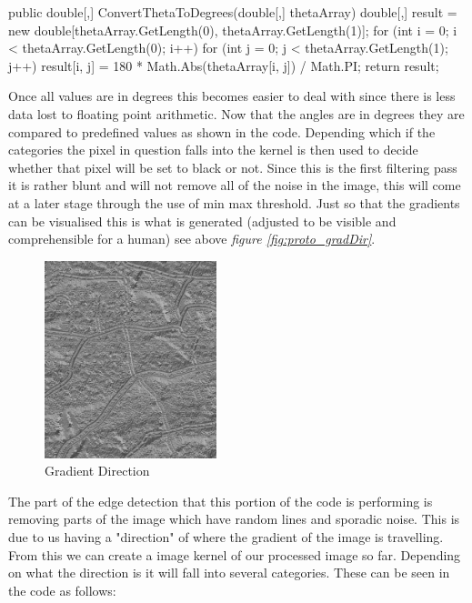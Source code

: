 \begin{FlushLeft}
        \begin{cscode}
public double[,] ConvertThetaToDegrees(double[,] thetaArray)
{
    double[,] result = new double[thetaArray.GetLength(0), thetaArray.GetLength(1)];
    for (int i = 0; i < thetaArray.GetLength(0); i++) for (int j = 0; j < thetaArray.GetLength(1); j++) result[i, j] = 180 * Math.Abs(thetaArray[i, j]) / Math.PI;
    return result;
}
        \end{cscode}
        
        Once all values are in degrees this becomes easier to deal with since there is less data lost to floating point arithmetic. Now that the angles are in degrees they are compared to predefined values as shown in the code. Depending which if the categories the pixel in question falls into the kernel is then used to decide whether that pixel will be set to black or not. Since this is the first filtering pass it is rather blunt and will not remove all of the noise in the image, this will come at a later stage through the use of min max threshold. Just so that the gradients can be visualised this is what is generated (adjusted to be visible and comprehensible for a human) see above \textit{figure \ref{fig:proto_gradDir}}. \\ \bk

        \begin{figure}[H]
            \centering
            \includegraphics[width=5cm]{images/edgeDetectionPrototype/f.jpg}
            \caption{Gradient Direction}
            \label{fig:proto_gradDirection}
        \end{figure} \bk


        The part of the edge detection that this portion of the code is performing is removing parts of the image which have random lines and sporadic noise. This is due to us having a "direction" of where the gradient of the image is travelling. From this we can create a image kernel of our processed image so far. Depending on what the direction is it will fall into several categories. These can be seen in the code as follows:


\end{FlushLeft}
